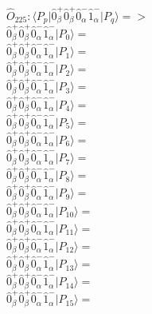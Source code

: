\documentclass[14pt]{article}
\begin{document}
    $\hat{O}_{225}:  \langle{P_p}\vert \hat{0}_{\beta}^{+}\hat{0}_{\beta}^{+}\hat{0}_{\alpha}^{-}\hat{1}_{\alpha}^{-} \vert{P_q}\rangle => $ \\ 
    $ \hat{0}_{\beta}^{+}\hat{0}_{\beta}^{+}\hat{0}_{\alpha}^{-}\hat{1}_{\alpha}^{-} \vert{P_{0}}\rangle =  $ \\ 
    $ \hat{0}_{\beta}^{+}\hat{0}_{\beta}^{+}\hat{0}_{\alpha}^{-}\hat{1}_{\alpha}^{-} \vert{P_{1}}\rangle =  $ \\ 
    $ \hat{0}_{\beta}^{+}\hat{0}_{\beta}^{+}\hat{0}_{\alpha}^{-}\hat{1}_{\alpha}^{-} \vert{P_{2}}\rangle =  $ \\ 
    $ \hat{0}_{\beta}^{+}\hat{0}_{\beta}^{+}\hat{0}_{\alpha}^{-}\hat{1}_{\alpha}^{-} \vert{P_{3}}\rangle =  $ \\ 
    $ \hat{0}_{\beta}^{+}\hat{0}_{\beta}^{+}\hat{0}_{\alpha}^{-}\hat{1}_{\alpha}^{-} \vert{P_{4}}\rangle =  $ \\ 
    $ \hat{0}_{\beta}^{+}\hat{0}_{\beta}^{+}\hat{0}_{\alpha}^{-}\hat{1}_{\alpha}^{-} \vert{P_{5}}\rangle =  $ \\ 
    $ \hat{0}_{\beta}^{+}\hat{0}_{\beta}^{+}\hat{0}_{\alpha}^{-}\hat{1}_{\alpha}^{-} \vert{P_{6}}\rangle =  $ \\ 
    $ \hat{0}_{\beta}^{+}\hat{0}_{\beta}^{+}\hat{0}_{\alpha}^{-}\hat{1}_{\alpha}^{-} \vert{P_{7}}\rangle =  $ \\ 
    $ \hat{0}_{\beta}^{+}\hat{0}_{\beta}^{+}\hat{0}_{\alpha}^{-}\hat{1}_{\alpha}^{-} \vert{P_{8}}\rangle =  $ \\ 
    $ \hat{0}_{\beta}^{+}\hat{0}_{\beta}^{+}\hat{0}_{\alpha}^{-}\hat{1}_{\alpha}^{-} \vert{P_{9}}\rangle =  $ \\ 
    $ \hat{0}_{\beta}^{+}\hat{0}_{\beta}^{+}\hat{0}_{\alpha}^{-}\hat{1}_{\alpha}^{-} \vert{P_{10}}\rangle =  $ \\ 
    $ \hat{0}_{\beta}^{+}\hat{0}_{\beta}^{+}\hat{0}_{\alpha}^{-}\hat{1}_{\alpha}^{-} \vert{P_{11}}\rangle =  $ \\ 
    $ \hat{0}_{\beta}^{+}\hat{0}_{\beta}^{+}\hat{0}_{\alpha}^{-}\hat{1}_{\alpha}^{-} \vert{P_{12}}\rangle =  $ \\ 
    $ \hat{0}_{\beta}^{+}\hat{0}_{\beta}^{+}\hat{0}_{\alpha}^{-}\hat{1}_{\alpha}^{-} \vert{P_{13}}\rangle =  $ \\ 
    $ \hat{0}_{\beta}^{+}\hat{0}_{\beta}^{+}\hat{0}_{\alpha}^{-}\hat{1}_{\alpha}^{-} \vert{P_{14}}\rangle =  $ \\ 
    $ \hat{0}_{\beta}^{+}\hat{0}_{\beta}^{+}\hat{0}_{\alpha}^{-}\hat{1}_{\alpha}^{-} \vert{P_{15}}\rangle =  $ \\ 
    
\end{document}
